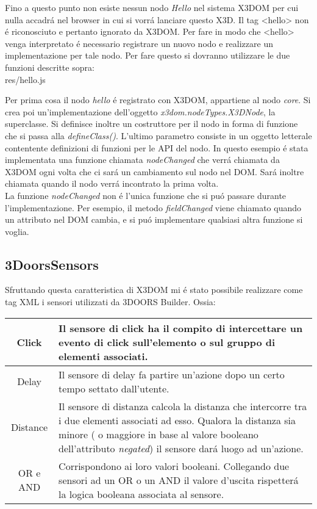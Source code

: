 \documentclass[11pt]{article}
\begin{document}
Fino a questo punto non esiste nessun nodo \textit{Hello} nel sistema X3DOM per cui nulla accadrá nel browser in cui si vorrá lanciare questo X3D. 
Il tag <hello> non é riconosciuto e pertanto ignorato da X3DOM. Per fare in modo che <hello> venga interpretato é necessario registrare un nuovo nodo e realizzare un implementazione per tale nodo. 
Per fare questo si dovranno utilizzare le due funzioni descritte sopra:\\

\vspace{2mm}
\small
{res/hello.js}
\vspace{2mm}

Per prima cosa il nodo \textit{hello} é registrato con X3DOM, appartiene al nodo \textit{core}. Si crea poi un'implementazione dell'oggetto \textit{x3dom.nodeTypes.X3DNode}, la superclasse. Si definisce inoltre un costruttore per il nodo in forma di funzione che si passa alla \textit{defineClass()}. L'ultimo parametro consiste in un oggetto letterale contentente definizioni di funzioni per le API del nodo. In questo esempio é stata implementata una funzione chiamata \textit{nodeChanged} che verrá chiamata da X3DOM ogni volta che ci sará un cambiamento sul nodo nel DOM. Sará inoltre chiamata quando il nodo verrá incontrato la prima volta.  \\
La funzione \textit{nodeChanged} non é l'unica funzione che si puó passare durante l'implementazione. Per esempio, il metodo \textit{fieldChanged} viene chiamato quando un attributo nel DOM cambia, e si puó implementare qualsiasi altra funzione si voglia. \\

    \subsection{3DoorsSensors}

    Sfruttando questa caratteristica di X3DOM mi é stato possibile realizzare come tag XML i sensori utilizzati da 3DOORS Builder. Ossia: \\
    \begin{center}
        \begin{tabular}{c | p{8cm}}
            \rowcolor{lightgray} Click & Il sensore di click ha il compito di intercettare un evento di click sull'elemento o sul gruppo di elementi associati. \\
            \hline
            Delay & Il sensore di delay fa partire un'azione dopo un certo tempo settato dall'utente. \\
            \hline
            \rowcolor{lightgray} Distance & Il sensore di distanza calcola la distanza che intercorre tra i due elementi associati ad esso. Qualora la distanza sia minore ( o maggiore in base al valore booleano dell'attributo \textit{negated}) il sensore dará luogo ad un'azione. \\
            \hline
            OR e AND & Corrispondono ai loro valori booleani. Collegando due sensori ad un OR o un AND il valore d'uscita rispetterá la logica booleana associata al sensore.  \\
        \end{tabular}
    \end{center}
\end{document}
